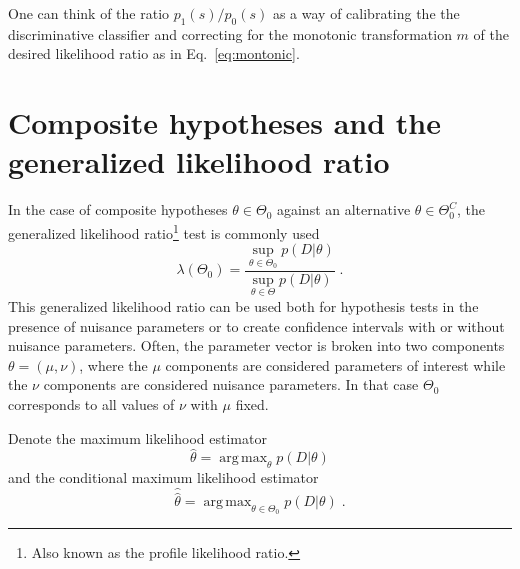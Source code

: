 \documentclass[aoas,preprint]{imsart}
\DeclareMathOperator*{\argmax}{arg\,max}
\numberwithin{equation}{section}
\theoremstyle{plain}
\begin{document}
One can think of the ratio $p_1(s)/p_0(s)$ as a way of calibrating the the discriminative classifier and correcting for the monotonic transformation $m$ of the desired likelihood ratio as in Eq.~\ref{eq:montonic}.




\section{Composite hypotheses and the generalized likelihood ratio}\label{S:GLR}

In the case of composite hypotheses $\theta \in \Theta_0$ against an alternative $\theta \in \Theta_0^C$, the generalized likelihood ratio\footnote{Also known as the profile likelihood ratio.} test is commonly used
\begin{equation}
\lambda(\Theta_0) =  \frac{ \sup_{\theta \in \Theta_0} p(D | \theta)}{ \sup_{\theta \in \Theta} p(D | \theta)} \; .
\end{equation}
This generalized likelihood ratio can be used both for hypothesis tests in the presence of nuisance parameters or to create confidence intervals with or without nuisance parameters.  Often, the parameter vector is broken into two components $\theta=(\mu,\nu)$, where the $\mu$ components are considered parameters of interest while the $\nu$ components are considered nuisance parameters. In that case $\Theta_0$ corresponds to all values of $\nu$ with $\mu$ fixed.

Denote the maximum likelihood estimator
\begin{equation}\label{eq:mle}
\hat{\theta} = \argmax_\theta  p(D | \theta)
\end{equation}
and the conditional maximum likelihood estimator
\begin{equation}\label{eq:cmle}
\hat{\hat{\theta}} = \argmax_{\theta \in \Theta_0}  p(D | \theta) \; .
\end{equation}
\end{document}
